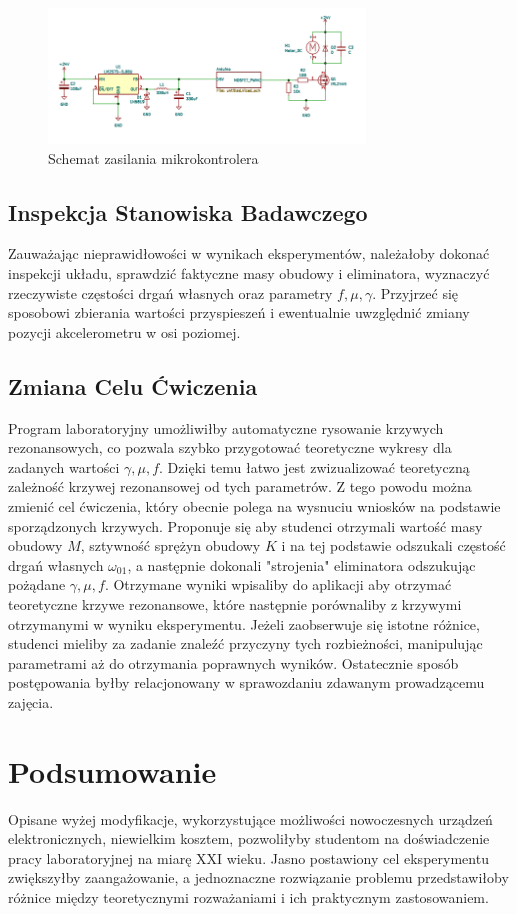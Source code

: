 \documentclass[12pt]{article}
\begin{document}
\begin{figure}[H]
	\centering
	\includegraphics[width=0.75\textwidth]{dem_sch}
	\caption{Schemat zasilania mikrokontrolera}
	\label{fig:sch}
\end{figure}

\subsection*{Inspekcja Stanowiska Badawczego}
Zauważając nieprawidłowości w wynikach eksperymentów, należałoby dokonać inspekcji układu, sprawdzić faktyczne masy obudowy i eliminatora, wyznaczyć rzeczywiste częstości drgań własnych oraz parametry $f, \mu, \gamma$. Przyjrzeć się sposobowi zbierania wartości przyspieszeń i ewentualnie uwzględnić zmiany pozycji akcelerometru w osi poziomej.

\subsection*{Zmiana Celu Ćwiczenia}
Program laboratoryjny umożliwiłby automatyczne rysowanie krzywych rezonansowych, co pozwala szybko przygotować teoretyczne wykresy dla zadanych wartości $\gamma, \mu, f$. Dzięki temu łatwo jest zwizualizować teoretyczną zależność krzywej rezonansowej od tych parametrów. Z tego powodu można zmienić cel ćwiczenia, który obecnie polega na wysnuciu wniosków na podstawie sporządzonych krzywych. Proponuje się aby studenci otrzymali wartość masy obudowy $M$, sztywność sprężyn obudowy $K$ i na tej podstawie odszukali częstość drgań własnych $\omega_{01}$, a następnie dokonali "strojenia" eliminatora odszukując pożądane $\gamma, \mu, f$. Otrzymane wyniki wpisaliby do aplikacji aby otrzymać teoretyczne krzywe rezonansowe, które następnie porównaliby z krzywymi otrzymanymi w wyniku eksperymentu. Jeżeli zaobserwuje się istotne różnice, studenci mieliby za zadanie znaleźć przyczyny tych rozbieżności, manipulując parametrami aż do otrzymania poprawnych wyników. Ostatecznie sposób postępowania byłby relacjonowany w sprawozdaniu zdawanym prowadzącemu zajęcia.
\section*{Podsumowanie}
Opisane wyżej modyfikacje, wykorzystujące możliwości nowoczesnych urządzeń elektronicznych, niewielkim kosztem, pozwoliłyby studentom na doświadczenie pracy laboratoryjnej na miarę XXI wieku. Jasno postawiony cel eksperymentu zwiększyłby zaangażowanie, a jednoznaczne rozwiązanie problemu przedstawiłoby różnice między teoretycznymi rozważaniami i ich praktycznym zastosowaniem.
\end{document}
